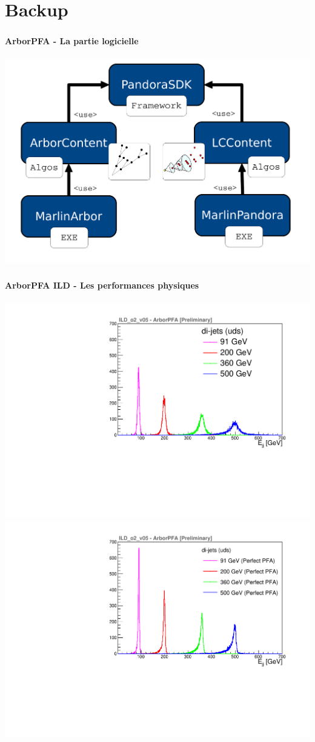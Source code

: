 \documentclass[8pt]{beamer}
\begin{document}

  \section*{Backup}

  \begin{frame}
  \frametitle{\secname}
  \framesubtitle{ArborPFA - La partie logicielle}
    \begin{center}
      \includegraphics[width=\linewidth]{ArborSoftwareView.pdf}
    \end{center}
  \end{frame}

  \begin{frame}
  \frametitle{\secname}
  \framesubtitle{ArborPFA ILD - Les performances physiques}
    \begin{center}
      \includegraphics[width=0.52\linewidth]{ILDArborPFA_ERec_NoNeutralHadron.pdf}
      \includegraphics[width=0.52\linewidth]{ILDArborPFA_PerfectERec_NoNeutralHadron.pdf}
    \end{center}
  \end{frame}
\end{document}
